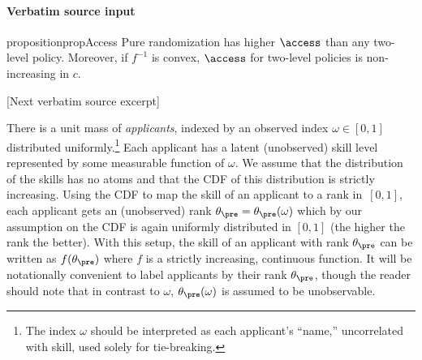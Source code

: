 \documentclass[10pt]{article}
\begin{document}
\paragraph{Verbatim source input}
\begin{ReviewVerbatim}
\begin{restatable}{proposition}{propAccess}
	Pure randomization has higher $\access$ than any two-level policy.
	Moreover, if $f^{-1}$ is convex, $\access$ for  two-level policies is non-increasing in $c$. %
	\label{prop:access}
\end{restatable}

[Next verbatim source excerpt]

There is a unit mass of \textit{applicants}, indexed by an observed index $\omega \in [0,1]$ distributed uniformly.\footnote{The index $\omega$ should be interpreted as each applicant's ``name,'' uncorrelated with skill, used solely for tie-breaking.}  Each applicant has a latent (unobserved) skill level represented by some measurable function of $\omega$.
We assume that {the distribution of the skills} has no atoms and that the CDF of this distribution is strictly increasing.
Using the CDF to map the skill of an applicant to a rank in~$[0,1]$, each applicant gets an (unobserved) rank $\theta_\pre =\theta_\pre(\omega)$ which by our assumption on the CDF is again uniformly distributed in $[0, 1]$ (the higher the rank the better).  With this setup, the skill of an applicant with rank $\theta_\pre$ can be written as $f(\theta_\pre)$ where $f$ is a strictly increasing, continuous function.  {It will be notationally convenient to label applicants by their rank $\theta_\pre$, though the reader should note that in contrast to $\omega$, $\theta_\pre(\omega)$ is assumed to be unobservable.}




\end{ReviewVerbatim}
\end{document}
